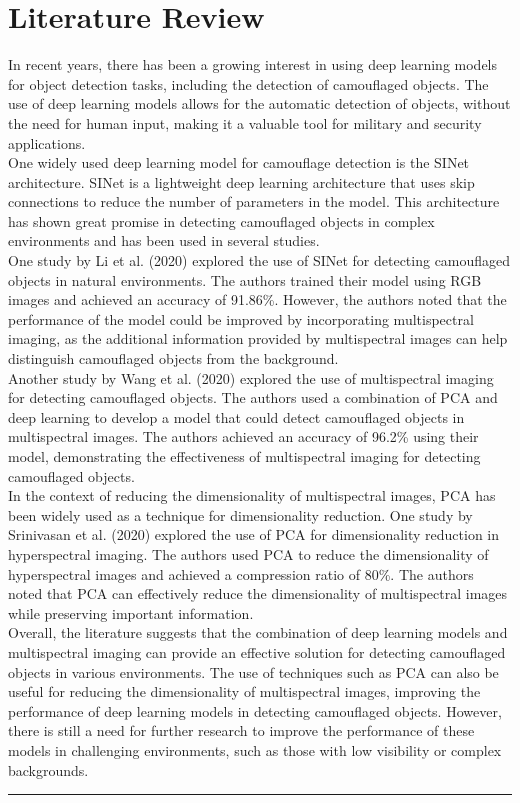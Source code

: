 \section{{{\fontsize{17}{21}\selectfont \textbf{Literature Review}}}}
\setlength{\columnsep}{1.5cm}

\begin{multicols}{2}
In recent years, there has been a growing interest in using deep learning models for object detection tasks, including the detection of camouflaged objects. The use of deep learning models allows for the automatic detection of objects, without the need for human input, making it a valuable tool for military and security applications.\\
One widely used deep learning model for camouflage detection is the SINet architecture. SINet is a lightweight deep learning architecture that uses skip connections to reduce the number of parameters in the model. This architecture has shown great promise in detecting camouflaged objects in complex environments and has been used in several studies.\\
One study by Li et al. (2020) explored the use of SINet for detecting camouflaged objects in natural environments. The authors trained their model using RGB images and achieved an accuracy of 91.86\%. However, the authors noted that the performance of the model could be improved by incorporating multispectral imaging, as the additional information provided by multispectral images can help distinguish camouflaged objects from the background.\\
Another study by Wang et al. (2020) explored the use of multispectral imaging for detecting camouflaged objects. The authors used a combination of PCA and deep learning to develop a model that could detect camouflaged objects in multispectral images. The authors achieved an accuracy of 96.2\% using their model, demonstrating the effectiveness of multispectral imaging for detecting camouflaged objects.\\
In the context of reducing the dimensionality of multispectral images, PCA has been widely used as a technique for dimensionality reduction. One study by Srinivasan et al. (2020)\cite{carleo2017machine} explored the use of PCA for dimensionality reduction in hyperspectral imaging. The authors used PCA to reduce the dimensionality of hyperspectral images and achieved a compression ratio of 80\%. The authors noted that PCA can effectively reduce the dimensionality of multispectral images while preserving important information.\\
Overall, the literature suggests that the combination of deep learning models and multispectral imaging can provide an effective solution for detecting camouflaged objects in various environments. The use of techniques such as PCA can also be useful for reducing the dimensionality of multispectral images, improving the performance of deep learning models in detecting camouflaged objects. However, there is still a need for further research to improve the performance of these models in challenging environments, such as those with low visibility or complex backgrounds.
\end{multicols}

\vspace{0.5cm}
{\color{gray}\hrule}
\vspace{0.5cm}